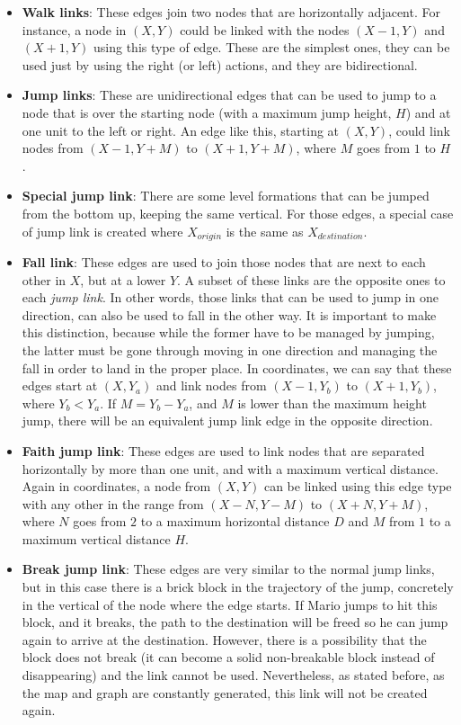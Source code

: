 \documentclass[conference]{IEEEtran}
\begin{document}
\begin{itemize}
\item \textbf{Walk links}: These edges join two nodes that are horizontally adjacent. For
instance, a node in $(X,Y)$ could be linked with the nodes $(X-1,Y)$ and $(X+1,Y)$ using
this type of edge. These are the simplest ones, they can be used just by using 
the right (or left) actions, and they are bidirectional.
\item \textbf{Jump links}: These are unidirectional edges that can be used to 
jump to a node that is over the starting node (with a maximum jump height, $H$) 
and at one unit to the left or right. An edge like this, starting at $(X,Y)$, 
could link nodes from $(X-1,Y+M)$ to $(X+1,Y+M)$, where $M$ goes from $1$ 
to $H$.
\item \textbf{Special jump link}: There are some level formations that can be jumped from
the bottom up, keeping the same vertical. For those edges, a special case of
jump link is created where $X_{origin}$ is the same as $X_{destination}$.
\item \textbf{Fall link}: These edges are used to join those nodes that are next
to each other in $X$, but at a lower $Y$. A subset of these links are the opposite ones
to each \textit{jump link}. In other words, those links that
can be used to jump in one direction, can also be used to fall in the
other way. It is important to make this distinction, because while the former have
to be managed by jumping, the latter must be gone through moving in one direction
and managing the fall in order to land in the proper place. 
In coordinates, we can say that these edges start at $(X,Y_{a})$
and link nodes from $(X-1,Y_{b})$ to $(X+1,Y_{b})$, where $Y_{b}<Y_{a}$. 
If $M = Y_{b}-Y_{a}$, and $M$ is lower than the maximum height jump, there will be
an equivalent jump link edge in the opposite direction.

\item \textbf{Faith jump link}: These edges are used to link nodes that are separated
horizontally by more than one unit, and with a maximum vertical distance. Again in
coordinates, a node from $(X,Y)$ can be linked using this edge type with any other
in the range from $(X-N,Y-M)$ to $(X+N,Y+M)$, where $N$ goes from $2$ to a maximum 
horizontal distance $D$ and $M$ from $1$ to a maximum vertical distance $H$.
\item \textbf{Break jump link}: These edges are very similar to the normal jump
links, but in this case there is a brick block in the trajectory of the jump, concretely
in the vertical of the node where the edge starts. If Mario jumps to hit this block, and it 
breaks, the path to the destination will be freed so he can jump again to arrive at the 
destination. However, there is a possibility that the block does not break (it can become 
a solid non-breakable block instead of disappearing) and the link cannot be used. 
Nevertheless, as stated before, as the map and graph are constantly generated, this 
link will not be created again.
\end{itemize}
\end{document}
